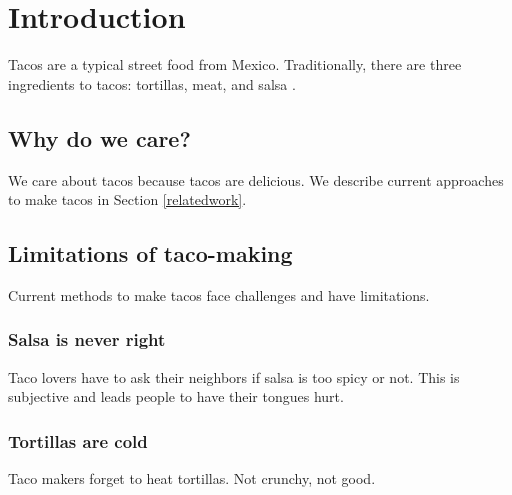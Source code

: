 
\section{Introduction}
\label{intro}

Tacos are a typical street food from Mexico.
Traditionally, there are three ingredients to tacos: tortillas, meat, and salsa \cite{lewis_computationalformfinding_2010, bletzinger_fiftyyears_2011}.

\subsection{Why do we care?}

We care about tacos because tacos are delicious.
We describe current approaches to make tacos in Section \ref{relatedwork}.

\subsection{Limitations of taco-making}
\label{limitations}

Current methods to make tacos face challenges and have limitations.

\subsubsection{Salsa is never right}
\label{salsa}

Taco lovers have to ask their neighbors if salsa is too spicy or not.
This is subjective and leads people to have their tongues hurt.
        
\subsubsection{Tortillas are cold}
\label{tortillas}

Taco makers forget to heat tortillas. Not crunchy, not good.

